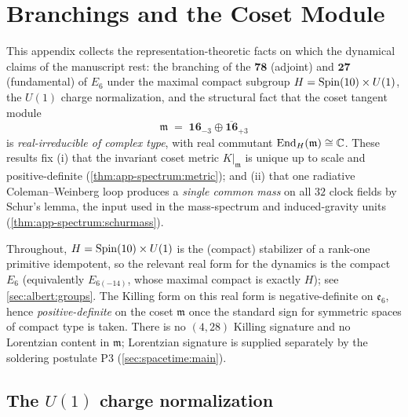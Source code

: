\section{Branchings and the Coset Module}
\label{sec:app-spectrum:main}

This appendix collects the representation-theoretic facts on which the
dynamical claims of the manuscript rest: the branching of the
$\mathbf{78}$ (adjoint) and $\mathbf{27}$ (fundamental) of $E_6$ under
the maximal compact subgroup $H=\operatorname{Spin}(10)\times U(1)$, the
$U(1)$ charge normalization, and the structural fact that the coset
tangent module
\[
  \mathfrak m \;=\; \mathbf{16}_{-3}\oplus\overline{\mathbf{16}}_{+3}
\]
is \emph{real-irreducible of complex type}, with real commutant
$\operatorname{End}_H(\mathfrak m)\cong\mathbb C$.  These results fix (i) that the
invariant coset metric $K|_{\mathfrak m}$ is unique up to scale and
positive-definite (\autoref{thm:app-spectrum:metric}); and (ii) that one
radiative Coleman--Weinberg loop produces a \emph{single common mass} on
all $32$ clock fields by Schur's lemma, the input used in the mass-spectrum
and induced-gravity units (\autoref{thm:app-spectrum:schurmass}).

Throughout, $H=\operatorname{Spin}(10)\times U(1)$ is the (compact) stabilizer of a
rank-one primitive idempotent, so the relevant real form for the dynamics
is the compact $E_6$ (equivalently $E_{6(-14)}$, whose maximal compact is
exactly $H$); see \autoref{sec:albert:groups}. The Killing form on this
real form is negative-definite on $\mathfrak e_6$, hence
\emph{positive-definite} on the coset $\mathfrak m$ once the standard
sign for symmetric spaces of compact type is taken. There is no
$(4,28)$ Killing signature and no Lorentzian content in $\mathfrak m$;
Lorentzian signature is supplied separately by the soldering postulate
P3 (\autoref{sec:spacetime:main}).

\subsection{The $U(1)$ charge normalization}
\label{sec:app-spectrum:u1}

